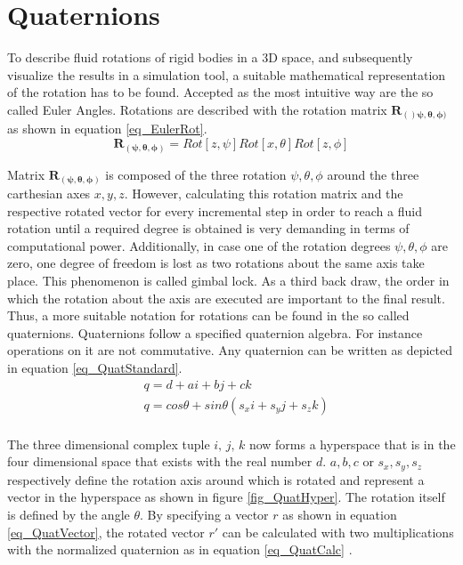    \section{Quaternions} \label{Quater}
   To describe fluid rotations of rigid bodies in a 3D space, and subsequently visualize the results in a simulation tool, a suitable mathematical representation of the rotation has to be found. Accepted as the most intuitive way are the so called Euler Angles. Rotations are described with the rotation matrix $\boldsymbol{R_{()\psi,\theta,\phi)}}$as shown in equation \ref{eq_EulerRot}. 
   \begin{equation}
   \label{eq_EulerRot}
   \boldsymbol{R_{(\psi,\theta,\phi)}} = Rot[z, \psi] Rot[x,\theta] Rot[z, \phi]  
   \end{equation}
  
   Matrix $ \boldsymbol{R_{(\psi,\theta,\phi)}}$  is composed of the three rotation $\psi, \theta, \phi$ around the three carthesian axes  $x, y, z$. However, calculating this rotation matrix and the respective rotated vector for every incremental step in order to reach a fluid rotation until a required degree is obtained is very demanding in terms of computational power. Additionally, in case one of the rotation degrees $\psi, \theta, \phi$ are zero, one degree of freedom is lost as two rotations about the same axis take place. This phenomenon is called gimbal lock. As a third back draw, the order in which the rotation about the axis are executed are important to the final result. Thus, a more suitable notation for rotations can be found in the so called quaternions. Quaternions follow a specified quaternion algebra. For instance operations on it are not commutative. Any quaternion can be written as depicted in equation \ref{eq_QuatStandard}. 
   \begin{equation}
   \begin{aligned}
   \label{eq_QuatStandard}
   & q = d + a\textit{i}+ b \textit{j} + c \textit{k} \\
   & q = cos\theta + sin\theta(s_x \textit{i} + s_y\textit{j} + s_z \textit{k} )\\
   \end{aligned}
   \end{equation}
   
   The three dimensional complex tuple $\textit{i, j, k}$ now forms a hyperspace that is in the four dimensional space that exists with the real number $\textit{d}$. $a,b,c$ or $s_x,s_y,s_z$ respectively define the rotation axis around which is rotated and represent a vector in the hyperspace as shown in figure \ref{fig_QuatHyper}. The rotation itself is defined by the angle $\theta$.  By specifying a vector $r$ as shown in equation \ref{eq_QuatVector}, the rotated vector $r'$ can be calculated with two multiplications with the normalized quaternion as in equation \ref{eq_QuatCalc} \cite{Quaternions}.
   
